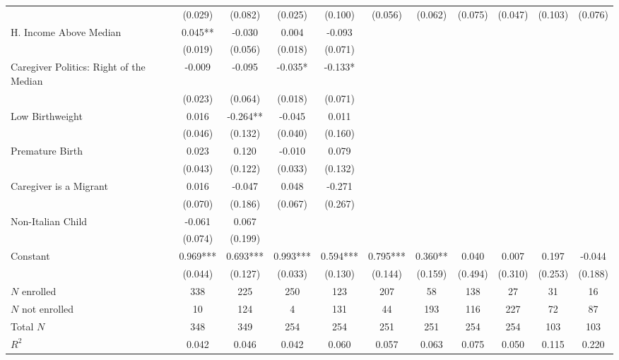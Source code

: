 \begin{tabular}{lcccccccccc}
 & (0.029) & (0.082) & (0.025) & (0.100) & (0.056) & (0.062) & (0.075) & (0.047) & (0.103) & (0.076) \\
H. Income Above Median & 0.045** & -0.030 & 0.004 & -0.093 &  &  &  &  &  &  \\
 & (0.019) & (0.056) & (0.018) & (0.071) &  &  &  &  &  &  \\
Caregiver Politics: Right of the Median & -0.009 & -0.095 & -0.035* & -0.133* &  &  &  &  &  &  \\
 & (0.023) & (0.064) & (0.018) & (0.071) &  &  &  &  &  &  \\
Low Birthweight & 0.016 & -0.264** & -0.045 & 0.011 &  &  &  &  &  &  \\
 & (0.046) & (0.132) & (0.040) & (0.160) &  &  &  &  &  &  \\
Premature Birth & 0.023 & 0.120 & -0.010 & 0.079 &  &  &  &  &  &  \\
 & (0.043) & (0.122) & (0.033) & (0.132) &  &  &  &  &  &  \\
Caregiver is a Migrant & 0.016 & -0.047 & 0.048 & -0.271 &  &  &  &  &  &  \\
 & (0.070) & (0.186) & (0.067) & (0.267) &  &  &  &  &  &  \\
Non-Italian Child & -0.061 & 0.067 &  &  &  &  &  &  &  &  \\
 & (0.074) & (0.199) &  &  &  &  &  &  &  &  \\
Constant & 0.969*** & 0.693*** & 0.993*** & 0.594*** & 0.795*** & 0.360** & 0.040 & 0.007 & 0.197 & -0.044 \\
 & (0.044) & (0.127) & (0.033) & (0.130) & (0.144) & (0.159) & (0.494) & (0.310) & (0.253) & (0.188) \\
\midrule
$N$ enrolled & 338 & 225 & 250 & 123 & 207 & 58 & 138 & 27 & 31 & 16 \\
$N$ not enrolled & 10 & 124 & 4 &131 & 44 & 193 & 116 & 227 & 72 & 87  \\
Total $N$ & 348 & 349 & 254 & 254 & 251 & 251 & 254 & 254 & 103 & 103 \\
$R^2$ & 0.042 & 0.046 & 0.042 & 0.060 & 0.057 & 0.063 & 0.075 & 0.050 & 0.115 & 0.220 \\
 \bottomrule
\end{tabular}
